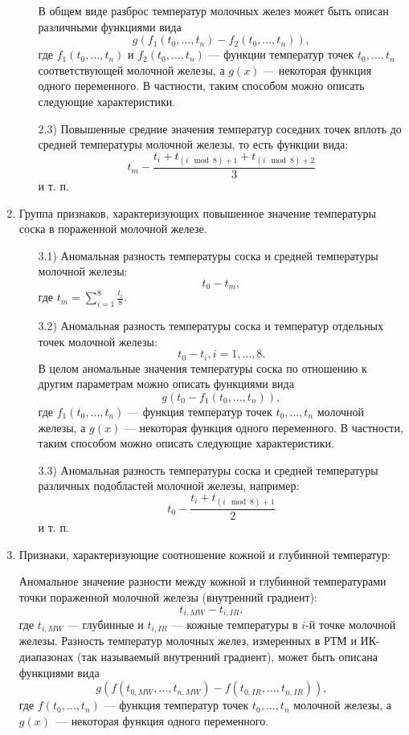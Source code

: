 \begin{enumerate}
\begin{enumerate}
        В общем виде разброс температур молочных желез может быть описан различными функциями
        вида
        \[g(f_{1}(t_{0}, \dots, t_{n}) - f_{2}(t_{0}, \dots,
        t_{n})),\]
        где \(f_{1}(t_{0}, \dots, t_{n})\) и \(f_{2}(t_{0}, \dots, t_{n})\) --- функции
        температур точек \(t_{0}, \dots, t_{n}\) соответствующей молочной железы, а \(g(x)\) ---         некоторая функция одного переменного. В частности, таким способом можно описать
        следующие \hbox{характеристики.}
        \item[2.3)] Повышенные средние значения температур соседних точек вплоть до средней температуры молочной железы, то есть функции вида:
        \[t_{m} - \frac{t_{i} + t_{(i \mod 8) + 1} + t_{(i \mod 8) + 2}}{3} \]
        и т. п.
    \end{enumerate}
    \item Группа признаков, характеризующих повышенное значение температуры соска в пораженной молочной железе.
    \begin{enumerate}
        \item[3.1)] Аномальная разность температуры соска и средней температуры молочной железы:
        \[t_{0} - t_{m},\]
        где \(t_{m} = \sum_{i=1}^{8}\frac{t_{i}}{8}\).
        \item[3.2)] Аномальная разность температуры соска и температур отдельных точек молочной железы:
        \[t_{0} - t_{i}, i = 1, \dots, 8. \]
        В целом аномальные значения температуры соска по отношению к другим параметрам можно описать функциями вида
        \[g(t_{0} - f_{1}(t_{0}, \dots, t_{n})),\]
        где \(f_{1}(t_{0}, \dots, t_{n})\) --- функция температур точек \(t_{0}, \dots, t_{n}\) молочной железы, а \(g(x)\) --- некоторая функция одного переменного. В частности, таким способом можно описать следующие характеристики.
        \item[3.3)] Аномальная разность температуры соска и средней температуры различных подобластей молочной железы, например:
        \[t_{0} - \frac{t_{i} + t_{(i \mod 8) + 1}}{2} \]
        и т. п.
    \end{enumerate}
    \item Признаки, характеризующие соотношение кожной и глубинной температур:

 Аномальное значение разности между кожной и глубинной температурами точки пораженной молочной железы (внутренний градиент):
        \[t_{i, MW}-t_{i, IR},\]
        где \(t_{i, MW}\) --- глубинные и \(t_{i, IR}\) --- кожные температуры в $i$-й точке молочной железы.
        Разность температур молочных желез, измеренных в РТМ и ИК-диапазонах (так называемый
        внутренний градиент), может быть описана функциями вида
        \[g(f(t_{0, MW}, \dots, t_{n, MW}) - f(t_{0, IR}, \dots, t_{n,
        IR})),\]
        где \(f(t_{0}, \dots, t_{n})\) --- функция температур точек \(t_{0}, \dots, t_{n}\) молочной железы, а \(g(x)\)~--- некоторая функция одного переменного.


\end{enumerate}
